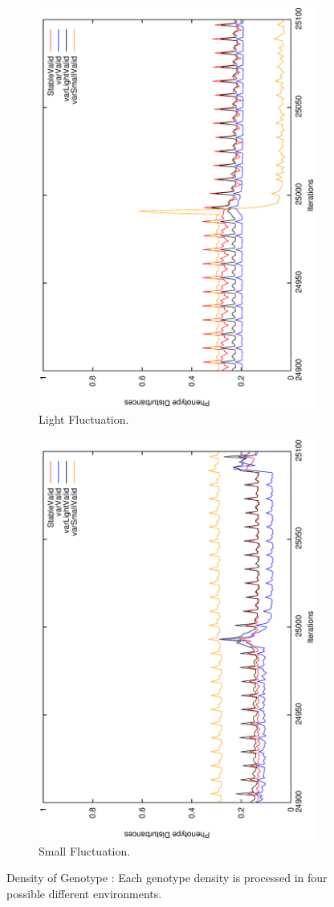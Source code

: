 \begin{figure}[H]
\begin{subfigure}{.25\textwidth}
  \centering
  \includegraphics[width=.7\linewidth, angle =-90]{img/avg499999variationLightb.eps}
  \caption{Light Fluctuation.}
\end{subfigure}%
\begin{subfigure}{.25\textwidth}
  \centering
  \includegraphics[width=.7\linewidth, angle =-90]{img/avg499999variationSmallb.eps}
  \caption{Small Fluctuation.}
\end{subfigure}
\caption{Density of Genotype : Each genotype density is processed in four possible different environments.}
\label{fig:density}
\end{figure}


